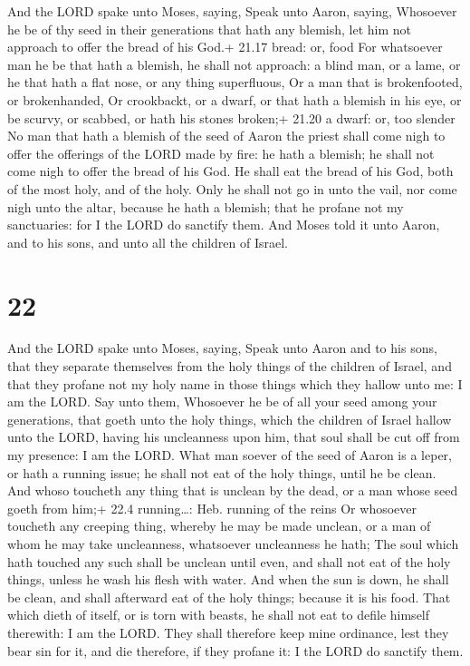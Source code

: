  And the LORD spake unto Moses, saying, 
Speak unto Aaron, saying, Whosoever he be of thy seed in their
generations that hath any blemish, let him not approach to offer the
bread of his God.+ 21.17 bread: or, food  For whatsoever
man he be that hath a blemish, he shall not approach: a blind man, or a
lame, or he that hath a flat nose, or any thing superfluous,
 Or a man that is brokenfooted, or brokenhanded,
 Or crookbackt, or a dwarf, or that hath a blemish in his
eye, or be scurvy, or scabbed, or hath his stones broken;+ 21.20 a
dwarf: or, too slender  No man that hath a blemish of the
seed of Aaron the priest shall come nigh to offer the offerings of the
LORD made by fire: he hath a blemish; he shall not come nigh to offer
the bread of his God.  He shall eat the bread of his God,
both of the most holy, and of the holy.  Only he shall not
go in unto the vail, nor come nigh unto the altar, because he hath a
blemish; that he profane not my sanctuaries: for I the LORD do sanctify
them.  And Moses told it unto Aaron, and to his sons, and
unto all the children of Israel.

\hypertarget{section-21}{%
\section{22}\label{section-21}}

 And the LORD spake unto Moses, saying,  Speak
unto Aaron and to his sons, that they separate themselves from the holy
things of the children of Israel, and that they profane not my holy name
in those things which they hallow unto me: I am the LORD. 
Say unto them, Whosoever he be of all your seed among your generations,
that goeth unto the holy things, which the children of Israel hallow
unto the LORD, having his uncleanness upon him, that soul shall be cut
off from my presence: I am the LORD.  What man soever of the
seed of Aaron is a leper, or hath a running issue; he shall not eat of
the holy things, until he be clean. And whoso toucheth any thing that is
unclean by the dead, or a man whose seed goeth from him;+ 22.4
running\ldots: Heb. running of the reins  Or whosoever
toucheth any creeping thing, whereby he may be made unclean, or a man of
whom he may take uncleanness, whatsoever uncleanness he hath;
 The soul which hath touched any such shall be unclean until
even, and shall not eat of the holy things, unless he wash his flesh
with water.  And when the sun is down, he shall be clean,
and shall afterward eat of the holy things; because it is his food.
 That which dieth of itself, or is torn with beasts, he
shall not eat to defile himself therewith: I am the LORD. 
They shall therefore keep mine ordinance, lest they bear sin for it, and
die therefore, if they profane it: I the LORD do sanctify them.

